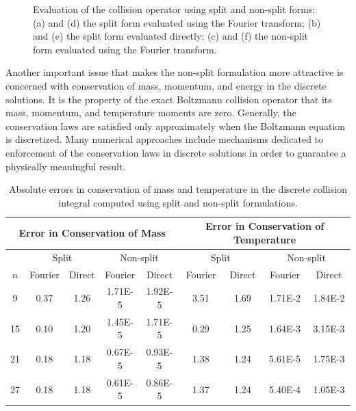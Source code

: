 \documentclass[12pt]{CSUNthesis}
\begin{document}
\begin{center}
\begin{figure}[h]
\begin{tabular}{@{}ccc@{}}
\end{tabular}
\caption{\label{fig01} Evaluation of the collision operator using split and non-split forms: (a) and (d) the split form evaluated using the Fourier transform; (b) and (e) the split form evaluated directly; (c) and (f) the non-split form evaluated using the Fourier transform.}
\end{figure}
\end{center}

Another important issue that makes the non-split formulation more attractive is concerned 
with conservation of mass, momentum, and energy in the discrete solutions. It is the property of 
the exact Boltzmann collision operator that its mass, momentum, and temperature moments are zero. 
Generally, the conservation laws are satisfied only approximately when the Boltzmann equation is 
discretized. Many numerical approaches include mechanisms dedicated to enforcement of  
the conservation laws in discrete solutions in order to guarantee a physically meaningful result.

 \begin{table}[h]
  \begin{tabular}[c]{ c c c c c | c c c c }
  \hline
  \multicolumn{5}{c|}{Error in Conservation of Mass} &
  \multicolumn{4}{c}{Error in Conservation of Temperature}\\
    \hline 
    & \multicolumn{2}{c|}{Split} & \multicolumn{2}{c|}{Non-split} &
    \multicolumn{2}{c|}{Split} & \multicolumn{2}{c}{Non-split} \\
    \hline
    $n$ & Fourier& Direct & Fourier & Direct 
        & Fourier& Direct & Fourier & Direct \\
    \hline
    9   & 0.37 & 1.26 & 1.71E-5 & 1.92E-5 &
          3.51 & 1.69 & 1.71E-2 & 1.84E-2  \\
    15  & 0.10 & 1.20 & 1.45E-5 & 1.71E-5 & 
          0.29 & 1.25 & 1.64E-3 & 3.15E-3 \\
    21  & 0.18 & 1.18 & 0.67E-5 & 0.93E-5 & 
          1.38 & 1.24 & 5.61E-5 & 1.75E-3 \\
    27  & 0.18 & 1.18 & 0.61E-5 & 0.86E-5 & 
          1.37 & 1.24 & 5.40E-4 & 1.05E-3 \\
    \hline
  \end{tabular}
\caption{\label{tab02} Absolute errors in conservation of mass and temperature in the discrete collision integral computed using split and non-split formulations.}
\end{table}
\end{document}
